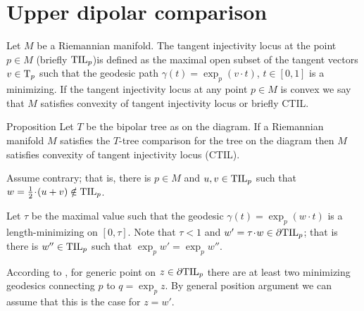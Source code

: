 \section{Upper dipolar comparison}

Let $M$ be a Riemannian manifold.
The tangent injectivity locus at the point $p\in M$ (briefly $\mathrm{\rm TIL}_p$)is defined as the maximal open subset of the tangent vectors $v\in\mathrm{T}_p$ such that the geodesic path $\gamma(t)=\exp_p(v\cdot t)$, $t\in [0,1]$ is a minimizing.
If the tangent injectivity locus at any point $p\in M$ is convex we say that $M$ satisfies convexity of  tangent injectivity locus or briefly CTIL.

{

\begin{wrapfigure}{r}{24 mm}
\end{wrapfigure}

\begin{thm}{Proposition}\label{T=>CTIL}
Let $T$ be the bipolar tree as on the diagram.
If a Riemannian manifold $M$ satisfies the $T$-tree comparison for the tree on the diagram then $M$ satisfies convexity of  tangent injectivity locus (CTIL).
\end{thm}

Assume contrary; that is, there is $p\in M$ and $u,v\zz\in \TIL_p$ such that $w=\tfrac12\cdot(u+v)\notin \TIL_p$.

}

Let $\tau$ be the maximal value such that the geodesic $\gamma(t)=\exp_p(w\cdot t)$ is a length-minimizing on $[0,\tau]$.
Note that $\tau<1$ and $w'=\tau\cdot w\in\partial \TIL_p$; that is there is $w''\in\mathrm{\rm TIL}_p$ such that $\exp_pw'=\exp_pw''$.



According to \cite{karcher}, for generic point on $z\in\partial \mathrm{\rm TIL}_p$ there are at least two minimizing geodesics connecting $p$ to $q=\exp_p z$.
By general position argument we can assume that this is the case for $z=w'$.

